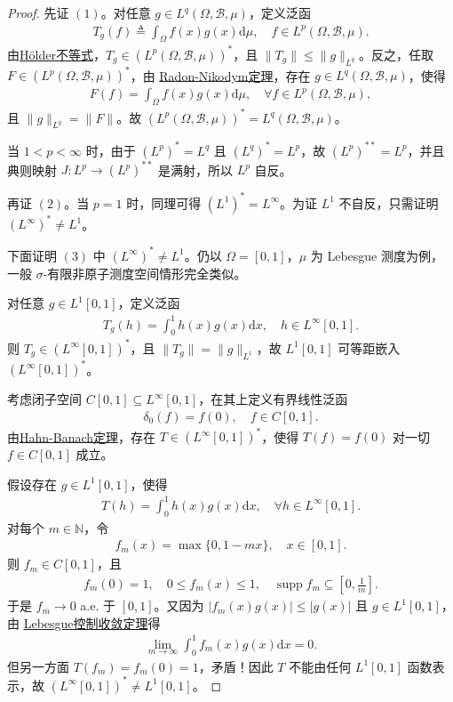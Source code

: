 \documentclass[../../main.tex]{subfiles}%
\begin{document}
\begin{proof}

先证 $(1)$。对任意 $g\in L^q(\Omega,\mathscr{B},\mu)$，定义泛函
\begin{align*}
T_g(f)\triangleq\int_{\Omega} f(x)g(x)\mathrm{d}\mu,\quad f\in L^p(\Omega,\mathscr{B},\mu).
\end{align*}
由\hyperref[Real Analysis-theorem:实变函数--Hölder不等式]{Hölder不等式}，$T_g\in (L^p(\Omega,\mathscr{B},\mu))^*$，且 $\|T_g\|\leqslant\|g\|_{L^q}$。反之，任取 $F\in (L^p(\Omega,\mathscr{B},\mu))^*$，由 \hyperref[theorem:泛函分析--Radon-Nikodym定理]{Radon-Nikodym定理}，存在 $g\in L^q(\Omega,\mathscr{B},\mu)$，使得
\begin{align*}
F(f)=\int_{\Omega} f(x)g(x)\mathrm{d}\mu,\quad \forall f\in L^p(\Omega,\mathscr{B},\mu),
\end{align*}
且 $\|g\|_{L^q}=\|F\|$。故 $(L^p(\Omega,\mathscr{B},\mu))^*=L^q(\Omega,\mathscr{B},\mu)$。

当 $1<p<\infty$ 时，由于 $(L^p)^*=L^q$ 且 $(L^q)^*=L^p$，故 $(L^p)^{**}=L^p$，并且典则映射 $J:L^p\to (L^p)^{**}$ 是满射，所以 $L^p$ 自反。

再证 $(2)$。当 $p=1$ 时，同理可得 $(L^1)^*=L^\infty$。为证 $L^1$ 不自反，只需证明 $(L^\infty)^*\neq L^1$。

下面证明 $(3)$ 中 $(L^\infty)^*\neq L^1$。仍以 $\Omega=[0,1]$，$\mu$ 为 Lebesgue 测度为例，一般 $\sigma$-有限非原子测度空间情形完全类似。

对任意 $g\in L^1[0,1]$，定义泛函
\begin{align*}
T_g(h)=\int_0^1 h(x)g(x)\mathrm{d}x,\quad h\in L^\infty[0,1].
\end{align*}
则 $T_g\in (L^\infty[0,1])^*$，且 $\|T_g\|=\|g\|_{L^1}$，故 $L^1[0,1]$ 可等距嵌入 $(L^\infty[0,1])^*$。

考虑闭子空间 $C[0,1]\subseteq L^\infty[0,1]$，在其上定义有界线性泛函
\begin{align*}
\delta_0(f)=f(0),\quad f\in C[0,1].
\end{align*}
由\hyperref[theorem:泛函分析--(哈恩-巴拿赫)Hahn-Banach定理]{Hahn-Banach定理}，存在 $T\in (L^\infty[0,1])^*$，使得 $T(f)=f(0)$ 对一切 $f\in C[0,1]$ 成立。

假设存在 $g\in L^1[0,1]$，使得
\begin{align*}
T(h)=\int_0^1 h(x)g(x)\mathrm{d}x,\quad \forall h\in L^\infty[0,1].
\end{align*}
对每个 $m\in\mathbb{N}$，令
\begin{align*}
f_m(x)=\max\{0,1-mx\},\quad x\in[0,1].
\end{align*}
则 $f_m\in C[0,1]$，且
\begin{align*}
f_m(0)=1,\quad 0\leqslant f_m(x)\leqslant 1,\quad \operatorname{supp} f_m\subseteq\left[0,\frac{1}{m}\right].
\end{align*}
于是 $f_m\to 0$ a.e. 于 $[0,1]$。又因为 $|f_m(x)g(x)|\leqslant |g(x)|$ 且 $g\in L^1[0,1]$，由 \hyperref[Real Analysis-theorem:控制收敛定理]{Lebesgue控制收敛定理}得
\begin{align*}
\lim\limits_{m\to\infty}\int_0^1 f_m(x)g(x)\mathrm{d}x=0.
\end{align*}
但另一方面 $T(f_m)=f_m(0)=1$，矛盾！因此 $T$ 不能由任何 $L^1[0,1]$ 函数表示，故 $(L^\infty[0,1])^*\neq L^1[0,1]$。


\end{proof}
\end{document}
